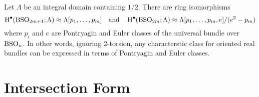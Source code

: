 \begin{theorem}\label{thm:cohomology_of_BSO}
  Let $\Lambda$ be an integral domain containing $1/2$. There are ring isomorphisms
  \[
      \operatorname{H}^\bullet({\operatorname{BSO}}_{2m+1}; \Lambda) \approx \Lambda[p_1, \ldots, p_m]
      \quad\textrm{and}\quad
      \operatorname{H}^\bullet({\operatorname{BSO}}_{2m}; \Lambda) \approx \Lambda[p_1, \ldots, p_m, e]/(e^2-p_m)
  \]
  where $p_i$ and $e$ are Pontryagin and Euler classes of the universal bundle over ${\operatorname{BSO}}_n$.
  In other words, ignoring $2$-torsion, any characterstic class for oriented real bundles can be expressed in terms of Pontryagin and Euler classes.
\end{theorem}

\section{Intersection Form}
